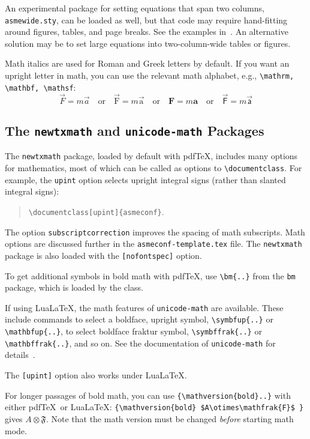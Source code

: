 \documentclass[colorlinks,upint,subscriptcorrection,varvw,balance,loadscripts,german,vietamese]{asmeconf} %
\newcommand*\pdfTeX{pdf\TeX}
\newcommand*\LuaLaTeX{Lua\LaTeX}
\begin{document}
An experimental package for setting equations that span two columns, \texttt{asmewide.sty}, can be loaded as well, but that code may require hand-fitting around figures, tables, and page breaks. See the examples in~\cite{lienhard2022}. An alternative solution may be to set large equations into two-column-wide tables or figures. 

Math italics are used for Roman and Greek letters by default.  If you want an upright letter in math, you can use the relevant math alphabet, e.g., \verb|\mathrm, \mathbf, \mathsf|:
\begin{equation}\label{eqn:dw}
\vec{F} = m \vec{a} \quad\textrm{or}\quad \vec{\mathrm{F}} = m \vec{\mathrm{a}} \quad\textrm{or}\quad \mathbf{F} = m \mathbf{a} \quad\textrm{or}\quad \vec{\mathsf{F}} = m \vec{\mathsf{a}}
\end{equation}

\subsection{The \texttt{newtxmath} and \texttt{unicode-math} Packages~\cite{sharpe1,robertson2023}} The \texttt{newtxmath} package, loaded by default with \pdfTeX, includes many options for mathematics, most of which can be called as options to \verb|\documentclass|. For example, the \texttt{upint} option selects upright integral signs (rather than slanted integral signs):
\begin{quote}
\verb|\documentclass[upint]{asmeconf}|. 
\end{quote}  
The option \verb|subscriptcorrection| improves the spacing of math subscripts. Math options are discussed further in the \texttt{asmeconf-template.tex} file.  The \texttt{newtxmath} package is also loaded with the \texttt{[nofontspec]} option.

To get additional symbols in bold math with \pdfTeX, use \verb|\bm{..}| from the \texttt{bm} package, which is loaded by the class. 

If using \LuaLaTeX, the math features of \texttt{unicode-math} are available.  These include commands to select a boldface, upright symbol, \verb|\symbfup{..}| or \verb|\mathbfup{..}|, to select boldface fraktur 
symbol, \verb|\symbffrak{..}| or \verb|\mathbffrak{..}|, and so on.  See the documentation of \texttt{unicode-math} for details~\cite{robertson2023}.

The \texttt{[upint]} option also works under \LuaLaTeX.

For longer passages of bold math, you can use \verb|{\mathversion{bold}..}| with either \pdfTeX\  or \LuaLaTeX: 
\verb|{\mathversion{bold} $A\otimes\mathfrak{F}$ }| gives { $A\otimes\mathfrak{F}$}. Note that the math version must be changed \emph{before} starting math mode.
\end{document}
